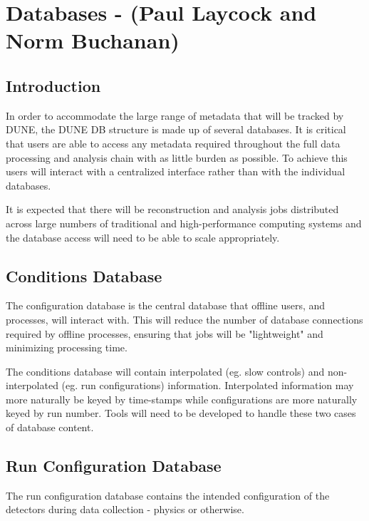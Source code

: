 \chapter{Databases - (Paul Laycock and Norm Buchanan)}
\label{ch:db}

\section{Introduction}
\label{sec:db:intro} 

In order to accommodate the large range of metadata that will be tracked by DUNE, the DUNE DB structure is made up of several databases. It is critical that users are able to access any metadata required throughout the full data processing and analysis chain with as little burden as possible. To achieve this users will interact with a centralized interface rather than with the individual databases. 

It is expected that there will be reconstruction and analysis jobs distributed across large numbers of traditional and high-performance computing systems and the database access will need to be able to scale appropriately.

\section{Conditions Database}
\label{sec:db:conditions} 

The configuration database is the central database that offline users, and processes, will interact with. This will reduce the number of database connections required by offline processes, ensuring that jobs will be "lightweight" and minimizing processing time.

The conditions database will contain interpolated (eg. slow controls) and non-interpolated (eg. run configurations) information. Interpolated information may more naturally be keyed by time-stamps while configurations are more naturally keyed by run number. Tools will need to be developed to handle these two cases of database content. 

\section{Run Configuration Database}
\label{sec:db:config}  

The run configuration database contains the intended configuration of the detectors during data collection - physics or otherwise. 

